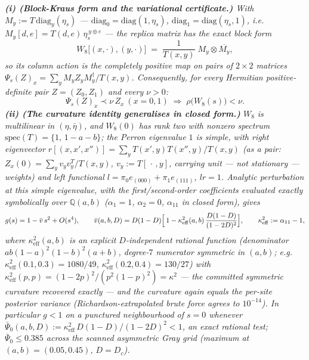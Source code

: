 \documentclass[
]{article}
\begin{document}
\emph{\textbf{(i) (Block-Kraus form and the variational certificate.)} With
$M_y:=T\,\mathrm{diag}_y(\eta_s)$ --- $\mathrm{diag}_0=\mathrm{diag}(1,\eta_s)$,
$\mathrm{diag}_1=\mathrm{diag}(\eta_s,1)$, i.e.\
$M_y[d,e]=T(d,e)\,\eta_s^{\,y\oplus e}$ --- the replica matrix has the exact
block form}
\[
  W_8\bigl[(x,\cdot),(y,\cdot)\bigr]\;=\;\frac1{T(x,y)}\;M_y\otimes\overline{M_y},
\]
\emph{so its column action is the completely positive map on pairs of
$2\times2$ matrices $\Psi_s(Z)_x=\sum_y M_y Z_y M_y^\dagger/T(x,y)$.
Consequently, for \emph{every} Hermitian positive-definite pair
$Z=(Z_0,Z_1)$ and every $\nu>0$:}
\[
  \Psi_s(Z)_x\prec\nu\,Z_x\ (x=0,1)
  \;\Longrightarrow\;\rho\bigl(W_8(s)\bigr)<\nu .
\]
\emph{\textbf{(ii) (The curvature identity generalises in closed form.)}
$W_8$ is multilinear in $(\eta,\bar\eta)$, and $W_8(0)$ has rank two with
nonzero spectrum $\mathrm{spec}(T)=\{1,\,1-a-b\}$; the Perron eigenvalue $1$
is simple, with right eigenvector $r[(x,x',x'')]=\sum_yT(x',y)T(x'',y)/T(x,y)$
(as a pair: $Z_x(0)=\sum_y v_yv_y^{T}/T(x,y)$, $v_y:=T[\,\cdot\,,y]$, carrying
\emph{unit} --- not stationary --- weights) and left functional
$l=\pi_0e_{(000)}+\pi_1e_{(111)}$, $lr=1$. Analytic perturbation at this
simple eigenvalue, with the first/second-order coefficients evaluated
\emph{exactly} symbolically over $\mathbb Q(a,b)$ ($\alpha_1=1$, $\alpha_2=0$,
$\alpha_{11}$ in closed form), gives}
\[
  g(s)=1-\bar v\,s^2+O(s^4),\qquad
  \bar v(a,b,D)=D(1-D)\Bigl[\,1-\kappa_{\mathrm{eff}}^2(a,b)\,
  \frac{D(1-D)}{(1-2D)^2}\Bigr],\qquad
  \kappa_{\mathrm{eff}}^2:=\alpha_{11}-1,
\]
\emph{where $\kappa_{\mathrm{eff}}^2(a,b)$ is an explicit $D$-independent
rational function (denominator $ab(1-a)^2(1-b)^2(a+b)$, degree-$7$ numerator
symmetric in $(a,b)$; e.g.\ $\kappa_{\mathrm{eff}}^2(0.1,0.3)=1080/49$,
$\kappa_{\mathrm{eff}}^2(0.2,0.4)=130/27$) with
$\kappa_{\mathrm{eff}}^2(p,p)=(1-2p)^2/(p^2(1-p)^2)=\kappa^2$ --- the
committed symmetric curvature recovered exactly --- and the curvature again
equals the per-site posterior variance (Richardson-extrapolated brute force
agrees to $10^{-14}$). In particular $g<1$ on a punctured neighbourhood of
$s=0$ whenever $\bar\Psi_0(a,b,D):=\kappa_{\mathrm{eff}}^2\,D(1-D)/(1-2D)^2<1$,
an exact rational test; $\bar\Psi_0\le0.385$ across the scanned asymmetric
Gray grid (maximum at $(a,b)=(0.05,0.45)$, $D=D_c$).}
\end{document}

